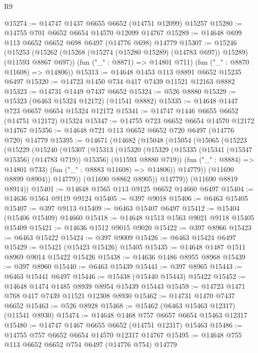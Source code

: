 \begin{lexlean}{R9}
\begin{coremodule}
{{{{{{{{{{{{{{{{{{{{{{{{{{{{{{{{{{{{{{{{{{{{{{{{{{{{{{{{{{{{{{{{{{{{{{{{{{{{{{{{{{{{@15274 := @14747 @1437 @6655 @6652 (@14751 @12099) @15257
@15280 := @14755 @701 @6652 @6654 @14570 @12099 @14767
@15289 := @14648 @699 @113 @6652 @6652 @698 @6497 (@14776 @698) @14779
@15307 := @15246
    (@15253
      (@15262 (@15268 (@15274 (@15280 @15289) (@14783 @697)) @15289) (@11593 @8867 @697))
      (fun ("_" : @8871) => @14801 @711)
      (fun ("_" : @8870 @11608) => @14806))
@15313 := @14648 @1453 @113 @8891 @6652 @15235 @6497
@15320 := @14723 @1450 @734 @417 @7439 @11521 @12163 @8882
@15323 := @14731 @1449 @7437 @6652
@15324 := @526 @8880
@15329 := @15323 (@6463 @15324 @12172) (@11541 @8882)
@15335 := @14648 @1447 @723 @6657 @6654 @15324 @12172
@15341 := @14747 @1446 @6655 @6652 (@14751 @12172) @15324
@15347 := @14755 @723 @6652 @6654 @14570 @12172 @14767
@15356 := @14648 @721 @113 @6652 @6652 @720 @6497 (@14776 @720) @14779
@15395 := @14671
    (@14682
      (@15048
        (@15054
          (@15065
            (@15223
              (@15229
                (@15240
                  (@15307
                    (@15313
                      (@15320
                        (@15329
                          (@15335 (@15341 (@15347 @15356) (@14783 @719)) @15356)
                          (@11593 @8880 @719))
                        (fun ("_" : @8884) => @14801 @733)
                        (fun ("_" : @8883 @11608) => @14806))
                      @14779))
                  (@11690 @8899 @8904))
                @14779))
            (@11690 @8862 @8905))
          @14779))
      (@11690 @8819 @8914))
@15401 := @14648 @1565 @113 @9125 @6652 @14660 @6497
@15404 := @14636 @1564 @9119 @9124
@15405 := @397 @9018
@15406 := @6463 @15405
@15407 := @397 @9113
@15409 := @6463 @15407 @6497
@15412 := @15404 (@15406 @15409) @14660
@15418 := @14648 @1513 @1563 @9021 @9118 @15405 @15409
@15421 := @14636 @1512 @9015 @9020
@15422 := @397 @8966
@15423 := @6463 @15422
@15424 := @397 @9009
@15426 := @6463 @15424 @6497
@15429 := @15421 (@15423 @15426) @15405
@15435 := @14648 @1487 @1511 @8969 @9014 @15422 @15426
@15438 := @14636 @1486 @8955 @8968
@15439 := @397 @8960
@15440 := @6463 @15439
@15441 := @397 @8965
@15443 := @6463 @15441 @6497
@15446 := @15438 (@15440 @15443) @15422
@15452 := @14648 @1474 @1485 @8939 @8954 @15439 @15443
@15459 := @14723 @1471 @768 @417 @7439 @11521 @12308 @8930
@15462 := @14731 @1470 @7437 @6652
@15463 := @526 @8928
@15468 := @15462 (@6463 @15463 @12317) (@11541 @8930)
@15474 := @14648 @1468 @757 @6657 @6654 @15463 @12317
@15480 := @14747 @1467 @6655 @6652 (@14751 @12317) @15463
@15486 := @14755 @757 @6652 @6654 @14570 @12317 @14767
@15495 := @14648 @755 @113 @6652 @6652 @754 @6497 (@14776 @754) @14779
}}}}}}}}}}}}}}}}}}}}}}}}}}}}}}}}}}}}}}}}}}}}}}}}}}}}}}}}}}}}}}}}}}}}}}}}}}}}}}}}}}}}
\end{coremodule}
\end{lexlean}
